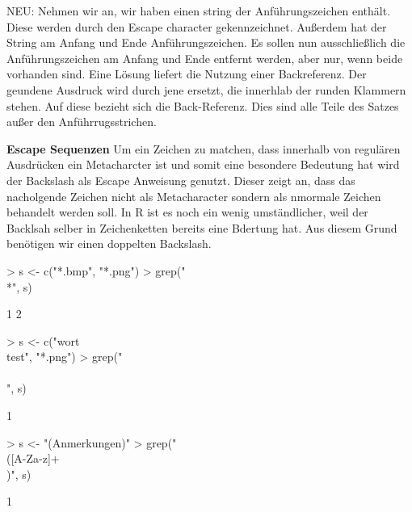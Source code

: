 \documentclass[a4paper]{report}
\newcommand{\R}{{\sffamily R}}
\begin{document}
NEU: Nehmen wir an, wir haben einen string der Anführungszeichen enthält. Diese werden durch den Escape character gekennzeichnet. Außerdem hat der String am Anfang und Ende Anführungszeichen. Es sollen nun ausschließlich die Anführungszeichen am Anfang und Ende entfernt werden, aber nur, wenn beide vorhanden sind. Eine Lösung liefert die Nutzung einer Backreferenz. Der geundene Ausdruck wird durch jene ersetzt, die innerhlab der runden Klammern stehen. Auf diese bezieht sich die Back-Referenz. Dies sind alle Teile des Satzes außer den Anführrugsstrichen.

\begin{Schunk}
\end{Schunk}

\textbf{Escape Sequenzen}
Um ein Zeichen zu matchen, dass innerhalb von regulären Ausdrücken ein Metacharcter ist und somit eine besondere Bedeutung hat wird der Backslash als  Escape Anweisung genutzt. Dieser zeigt an, dass das nacholgende Zeichen nicht als Metacharacter sondern als nmormale Zeichen behandelt werden soll. In \R{} ist es noch ein wenig umständlicher, weil der Backlsah selber in Zeichenketten bereits eine Bdertung hat. Aus diesem Grund benötigen wir einen doppelten Backslash.

\begin{Schunk}
\begin{Sinput}
> s <- c("*.bmp", "*.png")
> grep("\\*", s)  
\end{Sinput}
\begin{Soutput}
[1] 1 2
\end{Soutput}
\begin{Sinput}
> s <- c("wort\\test", "*.png")
> grep("\\\\", s)
\end{Sinput}
\begin{Soutput}
[1] 1
\end{Soutput}
\begin{Sinput}
> s <- "(Anmerkungen)"
> grep("\\([A-Za-z]+\\)", s)
\end{Sinput}
\begin{Soutput}
[1] 1
\end{Soutput}
\end{Schunk}
\end{document}
